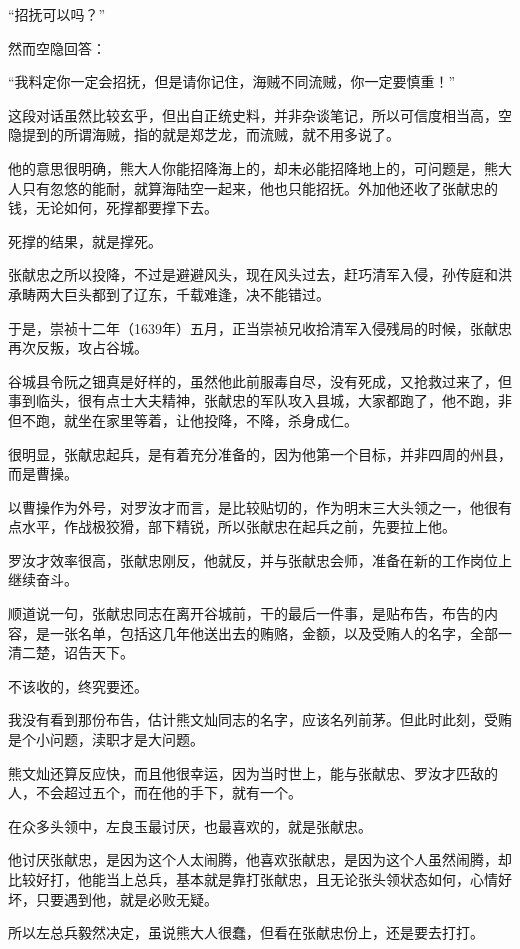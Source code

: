 \begin{multicols}{\theparacolNo}
“招抚可以吗？”

然而空隐回答：

“我料定你一定会招抚，但是请你记住，海贼不同流贼，你一定要慎重！”

这段对话虽然比较玄乎，但出自正统史料，并非杂谈笔记，所以可信度相当高，空隐提到的所谓海贼，指的就是郑芝龙，而流贼，就不用多说了。

他的意思很明确，熊大人你能招降海上的，却未必能招降地上的，可问题是，熊大人只有忽悠的能耐，就算海陆空一起来，他也只能招抚。外加他还收了张献忠的钱，无论如何，死撑都要撑下去。

死撑的结果，就是撑死。

张献忠之所以投降，不过是避避风头，现在风头过去，赶巧清军入侵，孙传庭和洪承畴两大巨头都到了辽东，千载难逢，决不能错过。

于是，崇祯十二年（1639年）五月，正当崇祯兄收拾清军入侵残局的时候，张献忠再次反叛，攻占谷城。

谷城县令阮之钿真是好样的，虽然他此前服毒自尽，没有死成，又抢救过来了，但事到临头，很有点士大夫精神，张献忠的军队攻入县城，大家都跑了，他不跑，非但不跑，就坐在家里等着，让他投降，不降，杀身成仁。

很明显，张献忠起兵，是有着充分准备的，因为他第一个目标，并非四周的州县，而是曹操。

以曹操作为外号，对罗汝才而言，是比较贴切的，作为明末三大头领之一，他很有点水平，作战极狡猾，部下精锐，所以张献忠在起兵之前，先要拉上他。

罗汝才效率很高，张献忠刚反，他就反，并与张献忠会师，准备在新的工作岗位上继续奋斗。

顺道说一句，张献忠同志在离开谷城前，干的最后一件事，是贴布告，布告的内容，是一张名单，包括这几年他送出去的贿赂，金额，以及受贿人的名字，全部一清二楚，诏告天下。

不该收的，终究要还。

我没有看到那份布告，估计熊文灿同志的名字，应该名列前茅。但此时此刻，受贿是个小问题，渎职才是大问题。

熊文灿还算反应快，而且他很幸运，因为当时世上，能与张献忠、罗汝才匹敌的人，不会超过五个，而在他的手下，就有一个。

在众多头领中，左良玉最讨厌，也最喜欢的，就是张献忠。

他讨厌张献忠，是因为这个人太闹腾，他喜欢张献忠，是因为这个人虽然闹腾，却比较好打，他能当上总兵，基本就是靠打张献忠，且无论张头领状态如何，心情好坏，只要遇到他，就是必败无疑。

所以左总兵毅然决定，虽说熊大人很蠢，但看在张献忠份上，还是要去打打。


\end{multicols}
